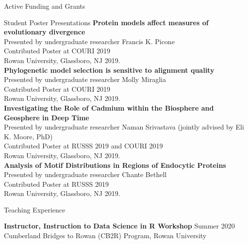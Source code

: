 \documentclass{resume} %
\begin{document}
\begin{rSection}{Active Funding and Grants}
\begin{rSection}{Student Poster Presentations}
\textbf{Protein models affect measures of evolutionary divergence}
\\ Presented by undergraduate researcher Francis K. Picone
\\ Contributed Poster at COURI 2019
\\ Rowan University, Glassboro, NJ 2019.\\

\textbf{Phylogenetic model selection is sensitive to alignment quality}
\\ Presented by undergraduate researcher Molly Miraglia
\\ Contributed Poster at COURI 2019
\\ Rowan University, Glassboro, NJ 2019.\\

\textbf{Investigating the Role of Cadmium within the Biosphere and Geosphere in Deep Time}
\\ Presented by undergraduate researcher Naman Srivastava (jointly advised by Eli K. Moore, PhD)
\\ Contributed Poster at RUSSS 2019 and COURI 2019
\\ Rowan University, Glassboro, NJ 2019.\\

\textbf{Analysis of Motif Distributions in Regions of Endocytic Proteins}
\\ Presented by undergraduate researcher Chante Bethell
\\ Contributed Poster at RUSSS 2019
\\ Rowan University, Glassboro, NJ 2019.\\


\end{rSection}





\vspace*{0.5cm}
\begin{rSection}{Teaching Experience}
\vspace*{0.25cm}

\textbf{Instructor, Instruction to Data Science in R Workshop} \hfill Summer 2020 \\ Cumberland Bridges to Rowan (CB2R) Program, Rowan University \\


\end{rSection}
\end{rSection}
\end{document}
